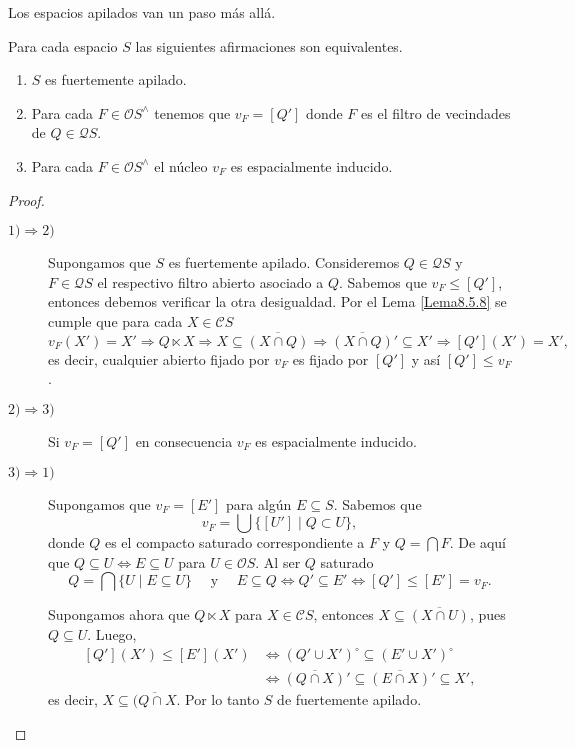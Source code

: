 Los espacios apilados van un paso más allá.

\begin{lem}\label{Lema8.5.11} 
    Para cada espacio $S$ las siguientes afirmaciones son equivalentes.
    \begin{enumerate}
        \item $S$ es fuertemente apilado.
        \item Para cada $F\in \mathcal{O}S^\wedge$ tenemos que $v_F=[Q']$ donde $F$ es el filtro de vecindades de $Q\in \mathcal{Q}S$.
        \item Para cada $F\in \mathcal{O}S^\wedge$ el núcleo $v_F$ es espacialmente inducido.
    \end{enumerate}
\end{lem}

\begin{proof}
\begin{description}
    \item[$1)\Rightarrow 2)$] Supongamos que $S$ es fuertemente apilado. Consideremos $Q\in \mathcal{Q}S$ y $F\in\mathcal{Q}S$ el respectivo filtro abierto asociado a $Q$. Sabemos que $v_F\leq [Q']$, entonces debemos verificar la otra desigualdad. Por el Lema \ref{Lema8.5.8} se cumple que para cada $X\in \mathcal{C}S$
    \[
    v_F(X')=X'\Rightarrow Q\ltimes X\Rightarrow X\subseteq \overline{(X\cap Q)}\Rightarrow \overline{(X\cap Q)}'\subseteq X'\Rightarrow [Q'](X')=X',
    \]  
    es decir, cualquier abierto fijado por $v_F$ es fijado por $[Q']$ y así $[Q']\leq v_F$.

    \item[$2)\Rightarrow 3)$] Si $v_F=[Q']$ en consecuencia $v_F$ es espacialmente inducido.

    \item[$3)\Rightarrow 1)$] Supongamos que $v_F=[E']$ para algún $E\subseteq S$. Sabemos que 
    \[
    v_F=\bigcup\{[U']\mid Q\subset U\},
    \]
    donde $Q$ es el compacto saturado correspondiente a $F$ y $Q=\bigcap F$. De aquí que  $Q\subseteq U \Leftrightarrow E\subseteq U$ para $U\in \mathcal{O}S$. Al ser $Q$ saturado
    \[
    Q=\bigcap \{U\mid E\subseteq U\}\quad\mbox{ y }\quad E\subseteq Q\Leftrightarrow Q'\subseteq E'\Leftrightarrow [Q']\leq [E']=v_F.
    \]

    Supongamos ahora que $Q\ltimes X$ para $X\in \mathcal{C}S$, entonces $X\subseteq \overline{(X\cap U)}$, pues $Q\subseteq U$. Luego, 
    \[
    \begin{split}
    [Q'](X')\leq [E'](X')&\Leftrightarrow (Q'\cup X')^\circ \subseteq (E'\cup X')^\circ\\
    &\Leftrightarrow \overline{(Q\cap X)}'\subseteq \overline{(E\cap X)}'\subseteq X',
    \end{split}
    \]
    es decir, $X\subseteq \overline{(Q\cap X}$. Por lo tanto $S$ de fuertemente apilado.
\end{description}
\end{proof}

